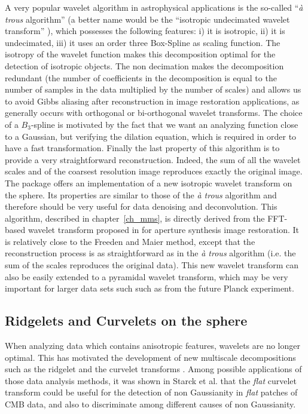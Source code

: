 A very popular wavelet algorithm in astrophysical applications is the so-called ``\emph{\`a trous} algorithm'' (a better name would be the 
``isotropic undecimated wavelet transform'' ), which possesses the following features: i) it is isotropic, ii) it is undecimated, iii) it uses 
an order three Box-Spline as scaling function. The isotropy of the wavelet function makes this decomposition optimal for the detection of 
isotropic objects. The non decimation makes the decomposition redundant (the number of coefficients in the decomposition is equal to the number 
of samples in the data multiplied by the number of scales) and allows us to avoid Gibbs aliasing after reconstruction in image restoration 
applications, as generally occurs with orthogonal or bi-orthogonal wavelet transforms. The choice of a $B_3$-spline is motivated by the fact 
that we want an analyzing function close to a Gaussian, but verifying the dilation equation, which is required in order to have a fast transformation. 
Finally the last property of this algorithm is to provide a very straightforward reconstruction. Indeed, the sum of all the wavelet scales and 
of the coarsest resolution image reproduces exactly the original image. \\

The \mrs package offers an implementation of a new isotropic wavelet transform on the sphere. Its properties are similar to those of the \emph{\`a trous} 
algorithm and therefore should be very useful for data denoising and deconvolution. This algorithm, described in chapter~\ref{ch_mms}, is directly derived
from the FFT-based wavelet transform proposed in\cite{starck:sta94_3} for aperture synthesis image restoration. It is relatively close to the Freeden and 
Maier \cite{freeden98} method, except that the reconstruction process is as straightforward as in the \emph{\`a trous} algorithm (i.e. the sum of the scales 
reproduces the original data). This new wavelet transform can also be easily extended to a pyramidal wavelet transform, which may be very important for 
larger data sets such such as from the future Planck experiment.

\subsection{Ridgelets and Curvelets on the sphere}
 
When analyzing data which contains anisotropic features, wavelets are no longer optimal. This has motivated the development of new multiscale 
decompositions such as the ridgelet and the curvelet transforms \cite{cur:donoho99,starck:sta01_3}. Among possible applications of those data 
analysis methods, it was shown in Starck et al. \cite*{starck:sta03_1} that the \emph{flat} curvelet transform could be useful for the detection 
of non Gaussianity in \emph{flat} patches of CMB data, and also to discriminate among different causes of non Gaussianity. 


